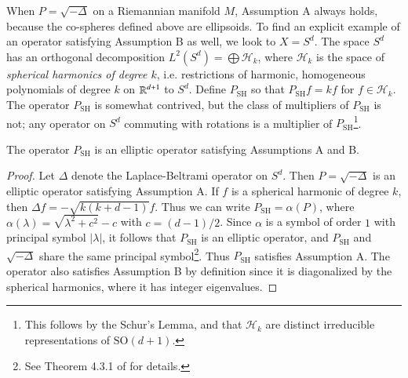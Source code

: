 \vspace{0.5em}

\noindent {}

\vspace{0.4em}

When $P = \sqrt{-\Delta}$ on a Riemannian manifold $M$, Assumption A always holds, because the co-spheres defined above are ellipsoids. To find an explicit example of an operator satisfying Assumption B as well, we look to $X = S^d$. The space $S^d$ has an orthogonal decomposition $L^2(S^d) = \bigoplus \mathcal{H}_k$, where $\mathcal{H}_k$ is the space of \emph{spherical harmonics of degree $k$}, i.e. restrictions of harmonic, homogeneous polynomials of degree $k$ on $\operatorname{\mathbb{R}}^{d+1}$ to $S^d$. Define $P_{\text{SH}}$ so that $P_{\text{SH}} f = kf$ for $f \in \mathcal{H}_k$. The operator $P_{\text{SH}}$ is somewhat contrived, but the class of multipliers of $P_{\text{SH}}$ is not; any operator on $S^d$ commuting with rotations is a multiplier of $P_{\text{SH}}$\footnote{This follows by the Schur's Lemma, and that $\mathcal{H}_k$ are distinct irreducible representations of $\text{SO}(d+1)$.}.

\begin{lemma}
  The operator $P_{\text{SH}}$ is an elliptic operator satisfying Assumptions A and B.
\end{lemma}
\begin{proof}
  Let $\Delta$ denote the Laplace-Beltrami operator on $S^d$. Then $P = \sqrt{-\Delta}$ is an elliptic operator satisfying Assumption A. If $f$ is a spherical harmonic of degree $k$, then $\Delta f = - \sqrt{k(k+d-1)} f$. Thus we can write $P_{\text{SH}} = \alpha(P)$, where $\alpha(\lambda) = \sqrt{ \lambda^2 + c^2 } - c$ with $c = (d-1)/2$. Since $\alpha$ is a symbol of order $1$ with principal symbol $|\lambda|$, it follows that $P_{\text{SH}}$ is an elliptic operator, and $P_{\text{SH}}$ and $\sqrt{-\Delta}$ share the same principal symbol\footnote{See Theorem 4.3.1 of \cite{Sogge} for details.}. Thus $P_{\text{SH}}$ satisfies Assumption A. The operator also satisfies Assumption B by definition since it is diagonalized by the spherical harmonics, where it has integer eigenvalues.
\end{proof}

